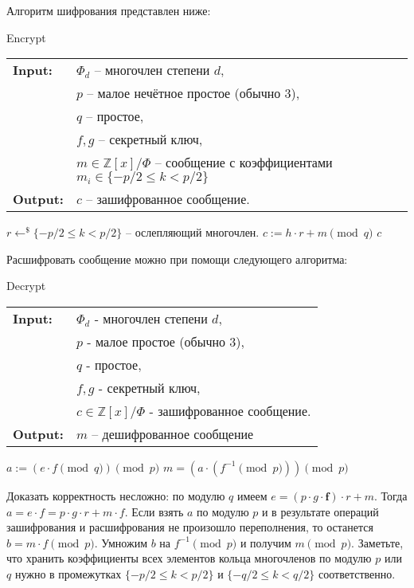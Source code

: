 \documentclass[11pt]{exam}
\newcommand{\Z}{\mathbb{Z}}
\begin{document}
{	Алгоритм шифрования представлен ниже:
	
	\begin{algorithm}[H] \caption{Encrypt} \label{encrypt}
		\begin{tabular}{ll}
		\textbf{Input:}  & $\Phi_d$ -- многочлен степени $d$, \\
		& $p$ -- малое нечётное простое (обычно 3), \\
		& $q$ -- простое, \\
		& $f,g$ -- секретный ключ,  \\
		& $m \in \Z[x]/\Phi$ -- сообщение с коэффициентами $m_i \in \{-p/2 \leqslant k <p/2\}$\\ 
		\textbf{Output:} & $c$ -- зашифрованное сообщение.
		\end{tabular}
		\begin{algorithmic}[1]
			\State $ r \leftarrow^\$ \{-p/2 \leqslant k <p/2\} $ -- ослепляющий многочлен.
			\State $c := h\cdot r + m \pmod{q}$
			\State \Return $c$
		\end{algorithmic}
	\end{algorithm}
	
	Расшифровать сообщение можно при помощи следующего алгоритма:
	
	\begin{algorithm}[H] \caption{Decrypt} \label{decrypt}
		\begin{tabular}{ll}
		\textbf{Input:} & $\Phi_d$ - многочлен степени $d$,\\
		& $p$ - малое простое (обычно 3),\\
		& $q$ - простое, \\
		& $f,g$ - секретный ключ, \\
		& $c \in \Z[x]/\Phi$ - зашифрованное сообщение.\\
		\textbf{Output:} & $m$ -- дешифрованное сообщение
	\end{tabular}
		\begin{algorithmic}[1]
			\State $ a:= ( e\cdot f \pmod{q} ) \pmod{p} $
			\State \Return $m = \left( a\cdot (f^{-1} \pmod{p}) \right) \pmod{p}$
		\end{algorithmic}
	\end{algorithm}

	Доказать корректность несложно: по модулю $q$ имеем $e = ( p\cdot g \cdot \mathbf{f})\cdot r + m $. Тогда $a = e \cdot f = p \cdot g \cdot r +  m\cdot f$. Если взять $a$ по модулю $p$ и в результате операций зашифрования и расшифрования не произошло переполнения, то останется $b = m\cdot f \pmod{p}$. Умножим $b$ на $f^{-1} \pmod{p}$ и получим $m \pmod{p}$. Заметьте, что хранить коэффициенты всех элементов кольца многочленов по модулю $p$ или $q$ нужно в промежутках $\{-p/2 \leqslant k <p/2\}$ и $\{-q/2 \leqslant k <q/2\}$ соответственно.
	
}
\end{document}
